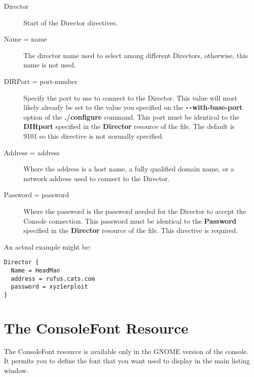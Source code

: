 \begin{description}
\item [Director]
   Start of the Director directives.

\item [Name = \lt{}name\gt{}]
   The director name used to select  among different Directors, otherwise, this
   name is not used. 

\item [DIRPort = \lt{}port-number\gt{}]
   Specify the port to use to connect  to the Director. This value will most
   likely already be set to the value  you specified on the {\bf
   \verb:--:with-base-port} option of the  {\bf ./configure} command. This port must be
   identical to the  {\bf DIRport} specified in the {\bf Director} resource of
   the  file.  The
   default is 9101 so this directive is not normally specified. 

\item [Address = \lt{}address\gt{}]
   Where the address is a host name,  a fully qualified domain name, or a network
   address used to connect  to the Director. 

\item [Password = \lt{}password\gt{}]
   Where the password is the  password needed for the Director to accept the
   Console connection.  This password must be identical to the {\bf Password}
   specified in  the {\bf Director} resource of the 
    file. This 
   directive is required. 
\end{description}

An actual example might be: 

\footnotesize
\begin{verbatim}
Director {
  Name = HeadMan
  address = rufus.cats.com
  password = xyz1erploit
}
\end{verbatim}
\normalsize

\section{The ConsoleFont Resource}

The ConsoleFont resource is available only in the GNOME version of the
console. It permits you to define the font that you want used to display in
the main listing window. 


